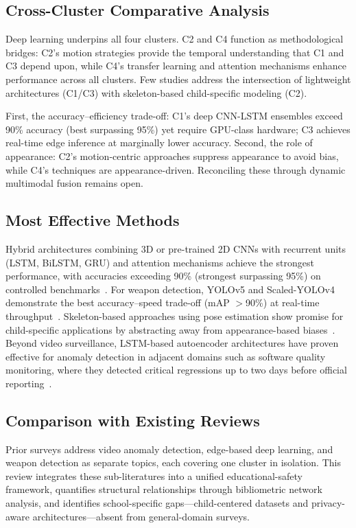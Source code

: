 \documentclass[conference]{IEEEtran}
\begin{document}
\subsection{Cross-Cluster Comparative Analysis}

Deep learning underpins all four clusters. C2 and C4 function as methodological bridges: C2's motion strategies provide the temporal understanding that C1 and C3 depend upon, while C4's transfer learning and attention mechanisms enhance performance across all clusters. Few studies address the intersection of lightweight architectures (C1/C3) with skeleton-based child-specific modeling (C2).

First, the accuracy--efficiency trade-off: C1's deep CNN-LSTM ensembles exceed 90\% accuracy (best surpassing 95\%) yet require GPU-class hardware; C3 achieves real-time edge inference at marginally lower accuracy. Second, the role of appearance: C2's motion-centric approaches suppress appearance to avoid bias, while C4's techniques are appearance-driven. Reconciling these through dynamic multimodal fusion remains open.

\subsection{Most Effective Methods}

Hybrid architectures combining 3D or pre-trained 2D CNNs with recurrent units (LSTM, BiLSTM, GRU) and attention mechanisms achieve the strongest performance, with accuracies exceeding 90\% (strongest surpassing 95\%) on controlled benchmarks~\cite{b17,b18,b2}. For weapon detection, YOLOv5 and Scaled-YOLOv4 demonstrate the best accuracy--speed trade-off (mAP $>$90\%) at real-time throughput~\cite{b19,b9}. Skeleton-based approaches using pose estimation show promise for child-specific applications by abstracting away from appearance-based biases~\cite{b16,b20}. Beyond video surveillance, LSTM-based autoencoder architectures have proven effective for anomaly detection in adjacent domains such as software quality monitoring, where they detected critical regressions up to two days before official reporting~\cite{b24}.

\subsection{Comparison with Existing Reviews}

Prior surveys address video anomaly detection, edge-based deep learning, and weapon detection as separate topics, each covering one cluster in isolation. This review integrates these sub-literatures into a unified educational-safety framework, quantifies structural relationships through bibliometric network analysis, and identifies school-specific gaps---child-centered datasets and privacy-aware architectures---absent from general-domain surveys.
\end{document}

